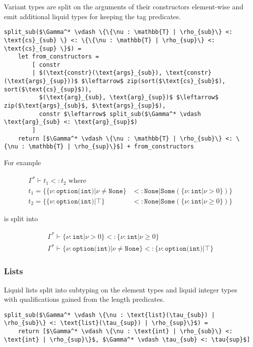 Variant types are split on the arguments of their constructors element-wise and
emit additional liquid types for keeping the tag predicates.

\begin{lstlisting}[language=pseudocode]
split_sub($\Gamma^* \vdash \{\{\nu : \mathbb{T} | \rho_{sub}\} <: \text{cs}_{sub} \} <: \{\{\nu : \mathbb{T} | \rho_{sup}\} <: \text{cs}_{sup} \}$) =
    let from_constructors =
        [ constr
        | $(\text{constr}(\text{args}_{sub}), \text{constr}(\text{args}_{sup}))$ $\leftarrow$ zip(sort($\text{cs}_{sub}$), sort($\text{cs}_{sup}$)),
          $(\text{arg}_{sub}, \text{arg}_{sup})$ $\leftarrow$ zip($\text{args}_{sub}$, $\text{args}_{sup}$),
          constr $\leftarrow$ split_sub($\Gamma^* \vdash \text{arg}_{sub} <: \text{arg}_{sup}$)
        ]
    return [$\Gamma^* \vdash \{\nu : \mathbb{T} | \rho_{sub}\} <: \{\nu : \mathbb{T} | \rho_{sup}\}$] + from_constructors
\end{lstlisting}

For example

\begin{align*}
  & \Gamma^* \vdash t_1 <: t_2 \text{ where}&\\
  & t_1 = \{\{\nu : \texttt{option(int)} | \nu \neq \texttt{None}\} & <: \texttt{None} | \texttt{Some}(\{\nu : \texttt{int} | \nu > 0\})\}\\
  & t_2 = \{\{\nu : \texttt{option(int)} | \top\} & <: \texttt{None} | \texttt{Some}(\{\nu : \texttt{int} | \nu \geq 0\})\}
\end{align*}

is split into

\begin{align*}
  & \Gamma^* \vdash \{\nu : \texttt{int} | \nu > 0\} <: \{\nu : \texttt{int} | \nu \geq 0\}\\
  & \Gamma^* \vdash \{\nu : \texttt{option(int)} | \nu \neq \texttt{None}\} <: \{\nu : \texttt{option(int)} | \top\}
\end{align*}

\subsubsection{Lists}

Liquid lists split into subtyping on the element types and liquid integer types
with qualifications gained from the length predicates.

\begin{lstlisting}[language=pseudocode]
split_sub($\Gamma^* \vdash \{\nu : \text{list}(\tau_{sub}) | \rho_{sub}\} <: \text{list}(\tau_{sup}) | \rho_{sup}\}$) =
    return [$\Gamma^* \vdash \{\nu : \text{int} | \rho_{sub}\} <: \text{int} | \rho_{sup}\}$, $\Gamma^* \vdash \tau_{sub} <: \tau{sup}$]
\end{lstlisting}

